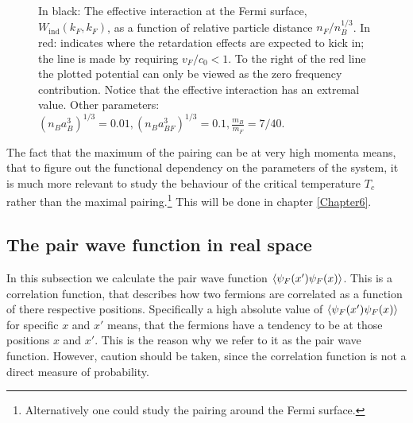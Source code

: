 \begin{figure} 
\begin{center}  
  
\caption{In black: The effective interaction at the Fermi surface, $W_{\text{ind}}(k_F,k_F)$, as a function of relative particle distance $n_F/n_B^{1/3}$. In red: indicates where the retardation effects are expected to kick in; the line is made by requiring $v_F/c_0 < 1$. To the right of the red line the plotted potential can only be viewed as the zero frequency contribution. Notice that the effective interaction has an extremal value. Other parameters: $(n_Ba_B^3)^{1/3} = 0.01, (n_Ba_{BF}^3)^{1/3} = 0.1, \frac{m_B}{m_F} = 7/40.$}  
\label{fig.EffectiveInteraction.nBdepend}  
\end{center}    
\end{figure}

The fact that the maximum of the pairing can be at very high momenta means, that to figure out the functional dependency on the parameters of the system, it is much more relevant to study the behaviour of the critical temperature $T_c$ rather than the maximal pairing.\footnote{Alternatively one could study the pairing around the Fermi surface.} This will be done in chapter \ref{Chapter6}.

\subsection{The pair wave function in real space}
In this subsection we calculate the pair wave function $\braket{\psi_F(x')\psi_F(x)}$. This is a correlation function, that describes how two fermions are correlated as a function of there respective positions. Specifically a high absolute value of $\braket{\psi_F(x')\psi_F(x)}$ for specific $x$ and $x'$ means, that the fermions have a tendency to be at those positions $x$ and $x'$. This is the reason why we refer to it as the pair wave function. However, caution should be taken, since the correlation function is not a direct measure of probability. 

